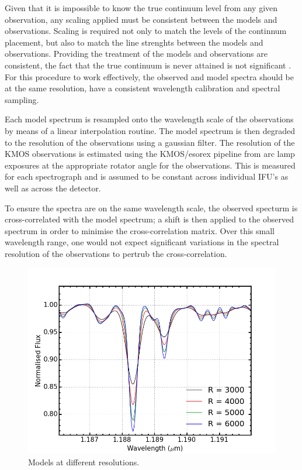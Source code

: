 \documentclass[12pt]{article}
\begin{document}
Given that it is impossible to know the true continuum level from any given observation,
any scaling applied must be consistent between the models and observations.
Scaling is required not only to match the levels of the continnum placement, but also to match the line strenghts between the models and observations.
Providing the treatment of the models and observations are consistent, the fact that the true continuum is never attained is not significant
\citep{2014ApJ...788...58G}.
For this procedure to work effectively, the observed and model spectra should be at the same resolution, have a consistent wavelength calibration and spectral sampling.

Each model spectrum is resampled onto the wavelength scale of the observations by means of a linear interpolation routine.
The model spectrum is then degraded to the resolution of the observations using a gaussian filter.
The resolution of the KMOS observations is estimated using the KMOS/esorex pipeline from arc lamp exposures at the appropriate rotator angle for the observations.
This is measured for each spectrograph and is assumed to be constant across individual IFU's as well as across the detector.

To ensure the spectra are on the same wavelength scale, the observed specturm is cross-correlated with the model spectrum;
a shift is then applied to the observed spectrum in order to minimise the cross-correlation matrix.
Over this small wavelength range, one would not expect significant variations in the spectral resolution of the observations to pertrub the cross-correlation.


\begin{figure}
 \centering
\includegraphics[width=\textwidth]{Resolution}
\caption{
Models at different resolutions.\label{fig:mod-res}
         }
\end{figure}
\end{document}
